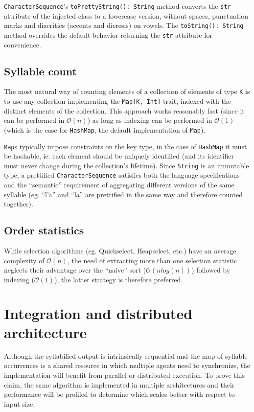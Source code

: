 \texttt{CharacterSequence}'s \texttt{toPrettyString(): String} method converts the \texttt{str} attribute of the injected class to a lowercase version, without spaces, punctuation marks and diacritics (accents and dieresis) on vowels.
The \texttt{toString(): String} method overrides the default behavior returning the \texttt{str} attribute for convenience.

\subsection{Syllable count}
The most natural way of counting elements of a collection of elements of type \texttt{K} is to use any collection implementing the \texttt{Map[K, Int]} trait, indexed with the distinct elements of the collection.
This approach works reasonably fast (since it can be performed in $\mathcal{O}(n)$) as long as indexing can be performed in $\mathcal{O}(1)$ (which is the case for \texttt{HashMap}, the default implementation of \texttt{Map}).

\texttt{Map}s typically impose constraints on the key type, in the case of \texttt{HashMap} it must be hashable, ie. each element should be uniquely identified (and its identifier must never change during the collection's lifetime). Since \texttt{String} is an immutable type, a prettified \texttt{CharacterSequence} satisfies both the language specifications and the ``semantic'' requirement of aggregating different versions of the same syllable (eg. ``l'a'' and ``la'' are prettified in the same way and therefore counted together).

\subsection{Order statistics}
While selection algorithms (eg. Quickselect, Heapselect, etc.) have an average complexity of $\mathcal{O}(n)$, the need of extracting more than one selection statistic neglects their advantage over the ``naive'' sort ($\mathcal{O}(n log(n))$) followed by indexing ($\mathcal{O}(1)$), the latter strategy is therefore preferred.


\section{Integration and distributed architecture}
Although the syllabified output is intrinsically sequential and the map of syllable occurrences is a shared resource in which multiple agents need to synchronize, the implementation will benefit from parallel or distributed execution. To prove this claim, the same algorithm is implemented in multiple architectures and their performance will be profiled to determine which scales better with respect to input size.

